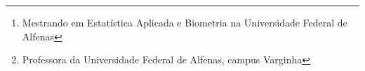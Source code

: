 \newcommand{\HRule}{\noindent\rule{\linewidth}{0.2mm}}

\usepackage{mathpazo}                         %
\usepackage[scaled=0.85]{beramono}            %

\renewcommand\UrlFont{\color{black}\rmfamily} 

\def\distnumber{2.3em}


\author{Walef Machado de Mendonça\footnote{Mestrando em Estatística Aplicada e Biometria na Universidade Federal de Alfenas}\\
Patrícia de Siqueira Ramos\footnote{Professora da Universidade Federal de Alfenas, campus Varginha}}

